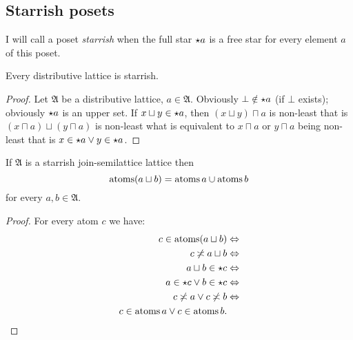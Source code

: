 \subsection{Starrish posets}
\begin{defn}
I will call a poset \emph{starrish}
when the full star $\star a$ is a free star for every element
$a$ of this poset.\end{defn}
\begin{prop}
Every distributive lattice is starrish.\end{prop}
\begin{proof}
Let $\mathfrak{A}$ be a distributive lattice, $a\in\mathfrak{A}$.
Obviously $\bot\notin\star a$ (if $\bot$ exists); obviously
$\star a$ is an upper set. If $x\sqcup y\in\star a$, then
$(x\sqcup y)\sqcap a$ is non-least that is $(x\sqcap a)\sqcup(y\sqcap a)$
is non-least what is equivalent to $x\sqcap a$ or $y\sqcap a$ being
non-least that is $x\in\star a\lor y\in\star a$.\end{proof}
\begin{thm}
\label{atoms-join}If $\mathfrak{A}$ is a starrish join-semilattice
lattice then
\[
\operatorname{atoms}(a\sqcup b)=\operatorname{atoms} a\cup\operatorname{atoms} b
\]
for every $a,b\in\mathfrak{A}$.\end{thm}
\begin{proof}
For every atom $c$ we have:
\begin{align*}
c\in\operatorname{atoms}(a\sqcup b) & \Leftrightarrow\\
c\not\asymp a\sqcup b & \Leftrightarrow\\
a\sqcup b\in\star c & \Leftrightarrow\\
a\in\star c\lor b\in\star c & \Leftrightarrow\\
c\not\asymp a\lor c\not\asymp b & \Leftrightarrow\\
c\in\operatorname{atoms} a\lor c\in\operatorname{atoms} b.
\end{align*}

\end{proof}

